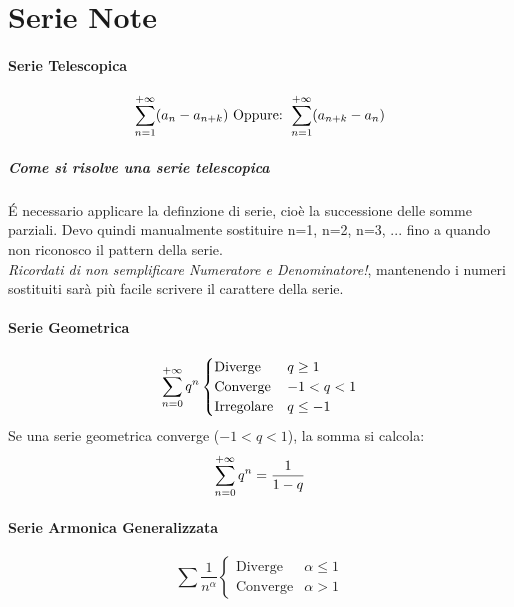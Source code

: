 \documentclass[12pt, a4paper, openany]{book}
\begin{document}
\section{Serie Note}

\paragraph*{Serie Telescopica}
\begin{equation*}
	\sum_{n=1}^{+\infty} (a_n - a_{n+k})
	\text{ Oppure: }
	\sum_{n=1}^{+\infty} (a_{n+k} - a_n)
\end{equation*}

\subparagraph{Come si risolve una serie telescopica}
É necessario applicare la definzione di serie, cioè la successione delle somme
parziali. Devo quindi manualmente sostituire n=1, n=2, n=3, ...
fino a quando non riconosco il pattern della serie.
\\ \emph{Ricordati di non semplificare Numeratore e Denominatore!},
mantenendo i numeri sostituiti sarà più facile scrivere il carattere della serie.


\paragraph*{Serie Geometrica}
\begin{equation*}
	\sum_{n=0}^{+\infty} q^n \begin{cases}
		\text{Diverge}    & q\geq 1  \\
		\text{Converge}   & -1<q<1   \\
		\text{Irregolare} & q\leq -1
	\end{cases}
\end{equation*}
 Se una serie geometrica converge ($-1<q<1$),
la somma si calcola:
\[
	\sum_{n=0}^{+\infty} q^n = \frac{1}{1-q}
\]

\paragraph*{Serie Armonica Generalizzata}
\begin{equation*}
	\sum \frac{1}{n^\alpha} \begin{cases}
		\text{Diverge}  & \alpha\leq 1 \\
		\text{Converge} & \alpha> 1
	\end{cases}
\end{equation*}
\end{document}

